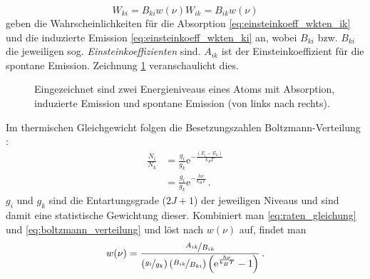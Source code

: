 \begin{subequations}\label{eq:einsteinkoeff_wkten}
	\begin{equation}\label{eq:einsteinkoeff_wkten_ik}
		W_{ki}=B_{ki}w(\nu)
	\end{equation}
	\begin{equation}\label{eq:einsteinkoeff_wkten_ki}
		W_{ik}=B_{ik}w(\nu)
	\end{equation}	
\end{subequations}
geben die Wahrscheinlichkeiten für die Absorption
\eqref{eq:einsteinkoeff_wkten_ik} und die induzierte Emission
\eqref{eq:einsteinkoeff_wkten_ki} an, wobei $B_{ki}$ bzw. $B_{ki}$ die
jeweiligen sog.
\textit{Einsteinkoeffizienten} sind. $A_{ik}$ ist der Einsteinkoeffizient für
die spontane Emission. Zeichnung \ref{fig:einstein_koeffizienten}
veranschaulicht dies.
\begin{figure}[h]
	\centering
	\caption[Einsteinkoeffizienten]{Eingezeichnet sind zwei Energieniveaus eines
	Atoms mit Absorption, induzierte Emission und spontane Emission (von links nach
	rechts).}\label{fig:einstein_koeffizienten}
\end{figure}
Im thermischen Gleichgewicht folgen die Besetzungszahlen
Boltzmann-Verteilung \cite{demtroeder:ex3}:
\begin{equation}\label{eq:boltzmann_verteilung}
	\begin{split}
		\frac{N_i}{N_k}&=\frac{g_i}{g_k}\mathrm{e}^{-\frac{(E_i-E_k)}{k_BT}}\\[0.2cm]
		&=\frac{g_i}{g_k}\mathrm{e}^{-\frac{h\nu}{k_BT}}\,.
	\end{split}	
\end{equation}
$g_i$ und $g_k$ sind die Entartungsgrade ($2J+1$) der jeweiligen Niveaus und
sind damit eine statistische Gewichtung dieser.
Kombiniert man \eqref{eq:raten_gleichung} und \eqref{eq:boltzmann_verteilung}
und löst nach $w(\nu)$ auf, findet man
\begin{equation}\label{eq:spektrale_energiedichte_1}
	w(\nu)=\frac{\nicefrac{A_{ik}}{B_{ik}}}{\left(\nicefrac{g_i}{g_k}\right)\left(\nicefrac{B_{ik}}{B_{ki}}\right)\left(\mathrm{e}^\frac{h\nu}{k_BT}-1\right)}\,.
\end{equation}
